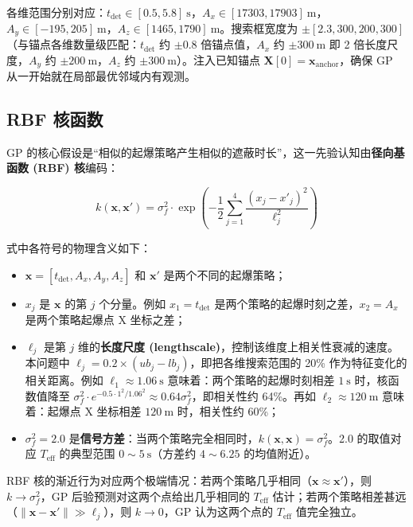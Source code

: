 \documentclass[12pt,a4paper]{ctexart}
\newcommand{\tdet}{t_{\text{det}}}
\newcommand{\Teff}{T_{\text{eff}}}
\newcommand{\X}{\mathbf{X}}
\begin{document}
各维范围分别对应：$\tdet \in [0.5, 5.8]\ \mathrm{s}$，$A_x \in [17303, 17903]\ \mathrm{m}$，$A_y \in [-195, 205]\ \mathrm{m}$，$A_z \in [1465, 1790]\ \mathrm{m}$。搜索框宽度为 $\pm[2.3, 300, 200, 300]$（与锚点各维数量级匹配：$\tdet$ 约 $\pm 0.8$ 倍锚点值，$A_x$ 约 $\pm 300\ \mathrm{m}$ 即 2 倍长度尺度，$A_y$ 约 $\pm 200\ \mathrm{m}$，$A_z$ 约 $\pm 300\ \mathrm{m}$）。注入已知锚点 $\X[0] = \mathbf{x}_{\text{anchor}}$，确保 GP 从一开始就在局部最优邻域内有观测。

\subsection{RBF 核函数}

GP 的核心假设是``相似的起爆策略产生相似的遮蔽时长''，这一先验认知由\textbf{径向基函数 (RBF) 核}编码：

\begin{equation}
\boxed{k(\mathbf{x}, \mathbf{x}') = \sigma_f^2 \cdot \exp\!\left(-\frac{1}{2}\sum_{j=1}^{4} \frac{(x_j - x'_j)^2}{\ell_j^2}\right)}
\end{equation}

式中各符号的物理含义如下：
\begin{itemize}
    \item $\mathbf{x} = [\tdet, A_x, A_y, A_z]$ 和 $\mathbf{x}'$ 是两个不同的起爆策略；
    \item $x_j$ 是 $\mathbf{x}$ 的第 $j$ 个分量。例如 $x_1 = \tdet$ 是两个策略的起爆时刻之差，$x_2 = A_x$ 是两个策略起爆点 X 坐标之差；
    \item $\ell_j$ 是第 $j$ 维的\textbf{长度尺度 (lengthscale)}，控制该维度上相关性衰减的速度。本问题中 $\ell_j = 0.2 \times (ub_j - lb_j)$，即把各维搜索范围的 20\% 作为特征变化的相关距离。例如 $\ell_1 \approx 1.06\ \mathrm{s}$ 意味着：两个策略的起爆时刻相差 $1\ \mathrm{s}$ 时，核函数值降至 $\sigma_f^2 \cdot e^{-0.5 \cdot 1^2/1.06^2} \approx 0.64\sigma_f^2$，即相关性约 64\%。再如 $\ell_2 \approx 120\ \mathrm{m}$ 意味着：起爆点 X 坐标相差 $120\ \mathrm{m}$ 时，相关性约 60\%；
    \item $\sigma_f^2 = 2.0$ 是\textbf{信号方差}：当两个策略完全相同时，$k(\mathbf{x}, \mathbf{x}) = \sigma_f^2$。2.0 的取值对应 $\Teff$ 的典型范围 $0 \sim 5\ \mathrm{s}$（方差约 $4 \sim 6.25$ 的均值附近）。
\end{itemize}

RBF 核的渐近行为对应两个极端情况：若两个策略几乎相同（$\mathbf{x} \approx \mathbf{x}'$），则 $k \to \sigma_f^2$，GP 后验预测对这两个点给出几乎相同的 $\Teff$ 估计；若两个策略相差甚远（$\|\mathbf{x} - \mathbf{x}'\| \gg \ell_j$），则 $k \to 0$，GP 认为这两个点的 $\Teff$ 值完全独立。
\end{document}
